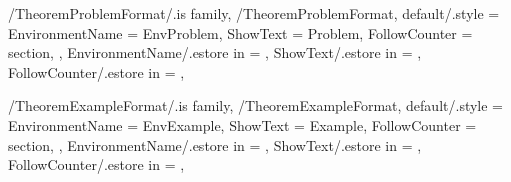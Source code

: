 \newcommand{\InsertCondition}[2][\empty]
{%
  \InsertTheoremContent[#1]{\GetTheoremConditionFormatEnvironmentName}{#2}%
} %

\newcommand{\InitTheoremConditionFormat}
{%
  \theoremstyle{definition}%
  \ifthenelse{\equal{\GetTheoremConditionFormatFollowCounter}{\empty}}%
  {%
    \newtheorem{%
      \GetTheoremConditionFormatEnvironmentName}{%
      \GetTheoremConditionFormatShowText}%
  }%
  {%
    \newtheorem{%
      \GetTheoremConditionFormatEnvironmentName}{%
      \GetTheoremConditionFormatShowText}[%
      \GetTheoremConditionFormatFollowCounter]%
  }%
} %


\pgfkeys
{
  /TheoremProblemFormat/.is family, /TheoremProblemFormat,
  default/.style =
  {
    EnvironmentName = {EnvProblem},
    ShowText = {Problem},
    FollowCounter = section,
  },
  EnvironmentName/.estore in = \GetTheoremProblemFormatEnvironmentName,
  ShowText/.estore in = \GetTheoremProblemFormatShowText,
  FollowCounter/.estore in = \GetTheoremProblemFormatFollowCounter,
} %

\newcommand{\InsertProblem}[2][\empty]
{%
  \InsertTheoremContent[#1]{\GetTheoremProblemFormatEnvironmentName}{#2}%
} %

\newcommand{\InitTheoremProblemFormat}
{%
  \theoremstyle{definition}%
  \ifthenelse{\equal{\GetTheoremProblemFormatFollowCounter}{\empty}}%
  {%
    \newtheorem{%
      \GetTheoremProblemFormatEnvironmentName}{%
      \GetTheoremProblemFormatShowText}%
  }%
  {%
    \newtheorem{%
      \GetTheoremProblemFormatEnvironmentName}{%
      \GetTheoremProblemFormatShowText}[%
      \GetTheoremProblemFormatFollowCounter]%
  }%
} %


\pgfkeys
{
  /TheoremExampleFormat/.is family, /TheoremExampleFormat,
  default/.style =
  {
    EnvironmentName = {EnvExample},
    ShowText = {Example},
    FollowCounter = section,
  },
  EnvironmentName/.estore in = \GetTheoremExampleFormatEnvironmentName,
  ShowText/.estore in = \GetTheoremExampleFormatShowText,
  FollowCounter/.estore in = \GetTheoremExampleFormatFollowCounter,
} %

\newcommand{\InsertExample}[2][\empty]
{%
  \InsertTheoremContent[#1]{\GetTheoremExampleFormatEnvironmentName}{#2}%
} %

